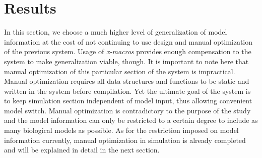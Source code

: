 \documentclass[../thesis.tex]{subfiles}
\begin{document}
\section{Results}
In this section, we choose a much higher level of generalization of model information at the cost of not continuing to use design and manual optimization of the previous system. Usage of \textit{x-macros} provides enough compensation to the system to make generalization viable, though. It is important to note here that manual optimization of this particular section of the system is impractical. Manual optimization requires all data structures and functions to be static and written in the system before compilation. Yet the ultimate goal of the system is to keep simulation section independent of model input, thus allowing convenient model switch. Manual optimization is contradictory to the purpose of the study and the model information can only be restricted to a certain degree to include as many biological models as possible. As for the restriction imposed on model information currently, manual optimization in simulation is already completed and will be explained in detail in the next section.
\end{document}
